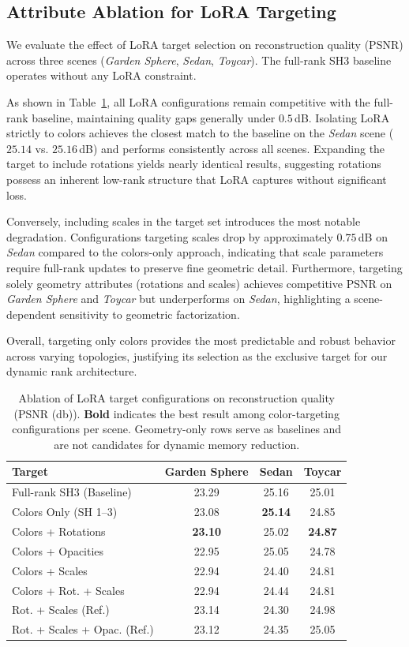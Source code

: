 \documentclass[sigconf]{acmart}
\begin{document}
\subsection{Attribute Ablation for LoRA Targeting}
We evaluate the effect of LoRA target selection on reconstruction quality 
(PSNR) across three scenes (\textit{Garden Sphere}, \textit{Sedan}, 
\textit{Toycar}). The full-rank SH3 baseline operates without any LoRA 
constraint.

As shown in Table~\ref{tab:target_selection}, all LoRA configurations remain 
competitive with the full-rank baseline, maintaining quality gaps generally 
under $0.5$\,dB. Isolating LoRA strictly to colors achieves the closest match 
to the baseline on the \textit{Sedan} scene ($25.14$ vs. $25.16$\,dB) and 
performs consistently across all scenes. Expanding the target to include 
rotations yields nearly identical results, suggesting rotations possess an 
inherent low-rank structure that LoRA captures without significant loss.

Conversely, including scales in the target set introduces the most notable 
degradation. Configurations targeting scales drop by approximately $0.75$\,dB 
on \textit{Sedan} compared to the colors-only approach, indicating that scale 
parameters require full-rank updates to preserve fine geometric detail. 
Furthermore, targeting solely geometry attributes (rotations and scales) 
achieves competitive PSNR on \textit{Garden Sphere} and \textit{Toycar} but 
underperforms on \textit{Sedan}, highlighting a scene-dependent sensitivity 
to geometric factorization.

Overall, targeting only colors provides the most predictable and robust 
behavior across varying topologies, justifying its selection as the exclusive 
target for our dynamic rank architecture.

\begin{table}[htbp]
\centering
\begin{tabular}{lccc}
\toprule
\textbf{Target} & \textbf{Garden Sphere} & \textbf{Sedan} & \textbf{Toycar} \\
\midrule
Full-rank SH3 (Baseline) & 23.29 & 25.16 & 25.01 \\
\midrule
Colors Only (SH 1--3) & 23.08 & \textbf{25.14} & 24.85 \\
Colors + Rotations & \textbf{23.10} & 25.02 & \textbf{24.87} \\
Colors + Opacities & 22.95 & 25.05 & 24.78 \\
Colors + Scales & 22.94 & 24.40 & 24.81 \\
Colors + Rot. + Scales & 22.94 & 24.44 & 24.81 \\
\midrule
Rot. + Scales (Ref.) & 23.14 & 24.30 & 24.98 \\
Rot. + Scales + Opac. (Ref.) & 23.12 & 24.35 & 25.05 \\
\bottomrule
\end{tabular}
\caption{Ablation of LoRA target configurations on reconstruction quality (PSNR (db)). \textbf{Bold} indicates the best result among color-targeting configurations per scene. Geometry-only rows serve as baselines and are not candidates for dynamic memory reduction.}
\label{tab:target_selection}
\end{table}
\end{document}
